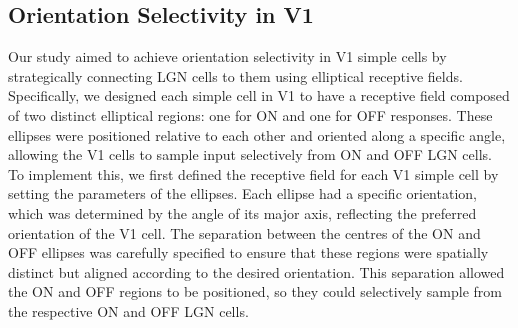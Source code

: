 \documentclass[12pt]{article}
\begin{document}
\subsection{Orientation Selectivity in V1}
Our study aimed to achieve orientation selectivity in V1 simple cells by strategically connecting LGN cells to them using elliptical receptive fields. Specifically, we designed each simple cell in V1 to have a receptive field composed of two distinct elliptical regions: one for ON and one for OFF responses. These ellipses were positioned relative to each other and oriented along a specific angle, allowing the V1 cells to sample input selectively from ON and OFF LGN cells. To implement this, we first defined the receptive field for each V1 simple cell by setting the parameters of the ellipses. Each ellipse had a specific orientation, which was determined by the angle of its major axis, reflecting the preferred orientation of the V1 cell. The separation between the centres of the ON and OFF ellipses was carefully specified to ensure that these regions were spatially distinct but aligned according to the desired orientation. This separation allowed the ON and OFF regions to be positioned, so they could selectively sample from the respective ON and OFF LGN cells.
\end{document}
